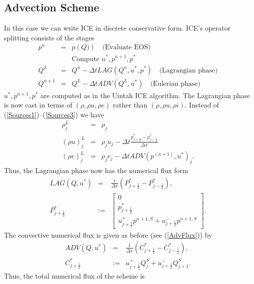 \documentclass[11pt,oneside]{article}
\def \D {\Delta}
\begin{document}
\subsection{Advection Scheme}
In this case we can write ICE in discrete conservative form. ICE's operator
splitting consists of the stages
\begin{eqnarray}
  p^{n} & = & p\left(Q)\right) \quad {\mbox{(Evaluate EOS)}} \\
  \label{EvalEOS}
  && {\mbox{Compute $u^*,p^{n+1},p^*$}} \\
  Q^L & = & Q^n - \D t LAG(Q^n,u^*,p^*) \quad {\mbox{(Lagrangian phase)}} \\
  \label{LAG}
  Q^{n+1} & = & Q^L - \D t ADV(Q^L,u^*) \quad {\mbox{(Eulerian phase)}}
  \label{ADV}
\end{eqnarray}
$u^*,p^{n+1},p^*$ are computed as in the Uintah ICE algorithm.
The Lagrangian phase is now cast in terms of $(\rho,\rho u,\rho e)$ rather
than $(\rho,\rho u,\rho i)$. Instead of (\ref{Sources1})--(\ref{Sources3})
we have
\begin{eqnarray}
   \rho^L_j     & = & \rho_j \\
   \label{LAG1}
   (\rho u)^L_j & = & \rho_j u_j - \D t \frac{p^*_{j+\frac12} -
               p^*_{j-\frac12}}{\D x} \\
   \label{LAG2}
   (\rho e)^L_j & = & \rho_j e_j - \D t ADV(p^{(n+1)},u^*)_j.
   \label{LAG3}
\end{eqnarray}
Thus, the Lagrangian phase now has the numerical flux form
\begin{eqnarray}
  LAG(Q,u^*) & = &
  \frac{1}{\D x} \left(P^*_{j+\frac12} - P^*_{j-\frac12}\right), \\
  \label{LAGFluxForm}
  P^*_{j+\frac12} & := &
  \left[
  \begin{array}{c}
  0\\
  p^*_{j+\frac12} \\
  u^+_{j+\frac12} p^{n+1,S} + u^-_{j+\frac12} p^{n+1,S}
  \end{array}
  \right].
  \label{PStar}
\end{eqnarray}
The convective numerical flux is given as before (see (\ref{AdvFlux})) by
\begin{eqnarray}
  ADV(Q,u^*) & = &
  \frac{1}{\D x} \left(C^*_{j+\frac12} - C^*_{j-\frac12}\right), \\
  \label{ADVFluxForm}
  C^*_{j+\frac12} & := & u^+_{j+\frac12} Q_j^S + u^-_{j+\frac12} Q^S_{j+1}.
  \label{CStar}
\end{eqnarray}
Thus, the total numerical flux of the scheme is
\end{document}
